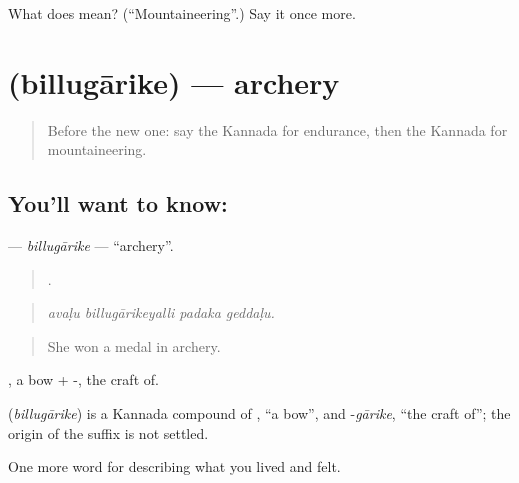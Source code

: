 \begin{tcolorbox}[breakable,colback=teal!4,colframe=teal!35!black,title={Before you move on}]
What does  mean? (\textquotedblleft{}Mountaineering\textquotedblright{}.) Say it once more.
\end{tcolorbox}
\section[\texorpdfstring{\kn{ಬಿಲ್ಲುಗಾರಿಕೆ} (billugārike)}{ಬಿಲ್ಲುಗಾರಿಕೆ (billugārike)}]{ (billugārike) — archery}

\label{lesson:KA-C541-billugarike}



\begin{quote}
Before the new one: say the Kannada for endurance, then the Kannada for mountaineering.
\end{quote}

\subsection*{You'll want to know: }
\textbf{} — \emph{billugārike} — \textquotedblleft{}archery\textquotedblright{}.

\begin{quote}
   .
\end{quote}

\begin{quote}
\emph{avaḷu billugārikeyalli padaka geddaḷu.}
\end{quote}

\begin{quote}
She won a medal in archery.
\end{quote}

, a bow + -, the craft of.

\begin{cousinweb}
\textbf{} (\emph{billugārike}) is a Kannada compound of , \textquotedblleft{}a bow\textquotedblright{}, and -\emph{gārike}, \textquotedblleft{}the craft of\textquotedblright{}; the origin of the suffix is not settled.
\end{cousinweb}

\begin{grammarlens}[title={What you've built}]
One more word for describing what you lived and felt.
\end{grammarlens}

